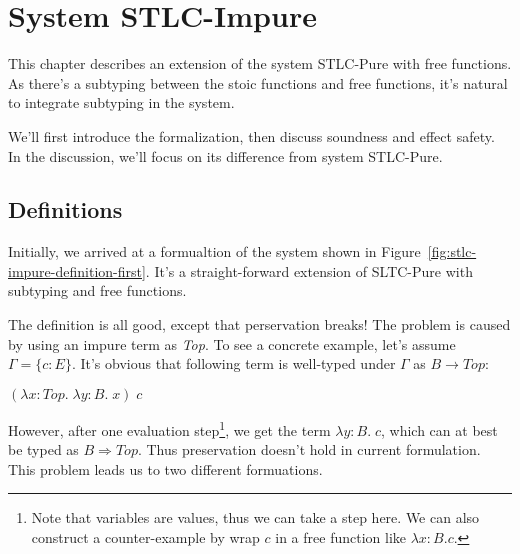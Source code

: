 \section{System STLC-Impure}

This chapter describes an extension of the system STLC-Pure with free
functions. As there's a subtyping between the stoic functions and free
functions, it's natural to integrate subtyping in the system.

We'll first introduce the formalization, then discuss soundness and
effect safety. In the discussion, we'll focus on its difference from
system STLC-Pure.

\subsection{Definitions}

Initially, we arrived at a formualtion of the system shown in
Figure~\ref{fig:stlc-impure-definition-first}. It's a straight-forward
extension of SLTC-Pure with subtyping and free functions.

The definition is all good, except that perservation breaks! The
problem is caused by using an impure term as \emph{Top}. To see a
concrete example, let's assume $\Gamma = \{c:E\}$. It's obvious that
following term is well-typed under $\Gamma$ as $B \to Top$:

\begin{center}
  $(\lambda x:Top. \; \lambda y:B. \; x) \; c$
\end{center}

However, after one evaluation step\footnote{Note that variables are
  values, thus we can take a step here. We can also construct a
  counter-example by wrap $c$ in a free function like
  $\lambda x:B. c$.}, we get the term $\lambda y:B. \; c$, which can
at best be typed as $B \Rightarrow Top$. Thus preservation doesn't
hold in current formulation. This problem leads us to two different
formuations.

